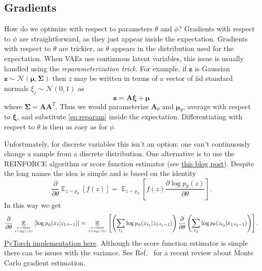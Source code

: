 \documentclass[preprint,notitlepage]{revtex4-1}
\newcommand*{\cN}{{\mathcal N}}
\def\vect#1{\ensuremath{\boldsymbol{#1}}}
\DeclareMathOperator*{\E}{\mathbb{E}}
\begin{document}
\subsection{Gradients}\label{sec:grads}

How do we optimize with respect to parameters $\theta$ and $\phi$? Gradients with respect to $\phi$ are straightforward, as they just appear inside the expectation. Gradients with respect to $\theta$ are trickier, as $\theta$ appears in the distribution used for the expectation. When VAEs use continuous latent variables, this issue is usually handled using the \emph{reparameterization trick}. For example, if $\vect{z}$ is Gaussian $\vect{z}\sim \cN(\bm\mu,\bm\Sigma)$ then $z$ may be written in terms of a vector of iid standard normals $\xi_j\sim \cN(0,1)$ as
%
\begin{equation}\label{eq:reparam}
  \vect{z}=\bm{A}\bm{\xi} + \bm{\mu}
\end{equation}
%
where $\bm\Sigma=\bm{A} \bm{A}^T$. Thus we would parameterize $\bm{A}_\theta$ and $\bm{\mu}_\theta$, average with respect to $\bm{\xi}$, and substitute \eqref{eq:reparam} inside the expectation. Differentiating with respect to $\theta$ is then as easy as for $\phi$.

Unfortunately, for discrete variables this isn't an option: one can't continuously change a sample from a discrete distribution. One alternative is to use the REINFORCE algorithm or score function estimator (see \href{http://stillbreeze.github.io/REINFORCE-vs-Reparameterization-trick/}{this blog post}). Despite the long names the idea is simple and is based on the identity
%
\begin{equation}
  \frac{\partial}{\partial \theta} \E_{z\sim p_\theta}\left[f(z)\right] =\E_{z\sim p_\theta}\left[f(z) \frac{\partial \log p_\theta(z)}{\partial \theta} \right].
\end{equation}
%
In this way we get
%
\begin{equation}
  \frac{\partial}{\partial \theta}\E_{x\sim\text{data} \atop z \sim p_\theta(\cdot|x)} \left[\log p_\phi(x_t|z_{1:t-1})\right] = \E_{x\sim\text{data} \atop z \sim p_\theta(\cdot|x)} \left[\left(\sum_{t_1} \log p_\phi(x_{t_1}|z_{1:t_1-1})\right)\frac{\partial}{\partial \theta}\left(\sum_{t_2} \log p_\theta(z_{t_2}|x_{1:t_2-1})\right)\right].
\end{equation}
%
\href{https://pytorch.org/docs/stable/distributions.html#score-function}{PyTorch implementation here}. Although the score function estimator is simple there can be issues with the variance. See Ref.~\cite{Mohamed:2019aa} for a recent review about Monte Carlo gradient estimation.
\end{document}
